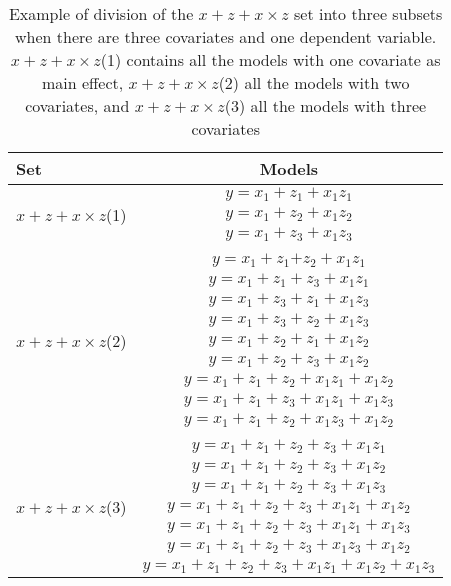 \begin{table}[ht!]
\caption{Example of division of the $x + z + x \times z$ set into three subsets when there are three covariates and one dependent variable. $x + z + x \times z$(1) contains all the models with one covariate as main effect, $x + z + x \times z$(2) all the models with two covariates, and $x + z + x \times z$(3) all the models with three covariates}
\centering\label{tab:appmodel2}
\begin{tabular}{lc}  
\toprule
Set & Models \\
\midrule
\multirow{3}{*}{$x + z + x \times z$(1)} & $y=x_1+z_1+x_1z_1$\\ & $y=x_1+z_2+x_1z_2$\\ & $y=x_1+z_3+x_1z_3$\\ & \\ 
\multirow{9}{*}{$x + z + x \times z$(2)} & $y=x_1+z_1$$+z_2+x_1z_1$\\ & $y=x_1+z_1+z_3+x_1z_1$\\ & $y=x_1+z_3+z_1+x_1z_3$\\ & $y=x_1+z_3+z_2+x_1z_3$\\ & $y=x_1+z_2+z_1+x_1z_2$\\ & $y=x_1+z_2+z_3+x_1z_2$\\ & $y=x_1+z_1+z_2+x_1z_1+x_1z_2$\\ & $y=x_1+z_1+z_3+x_1z_1+x_1z_3$\\ & $y=x_1+z_1+z_2+x_1z_3+x_1z_2$\\  & \\  
\multirow{7}{*}{$x + z + x \times z$(3)} & $y=x_1+z_1+z_2+z_3+x_1z_1$\\ & $y=x_1+z_1+z_2+z_3+x_1z_2$\\ & $y=x_1+z_1+z_2+z_3+x_1z_3$\\ & $y=x_1+z_1+z_2+z_3+x_1z_1+x_1z_2$\\ & $y=x_1+z_1+z_2+z_3+x_1z_1+x_1z_3$\\ & $y=x_1+z_1+z_2+z_3+x_1z_3+x_1z_2$\\ & $y=x_1+z_1+z_2+z_3+x_1z_1+x_1z_2+x_1z_3$\\  
\bottomrule
\end{tabular}
\end{table}

